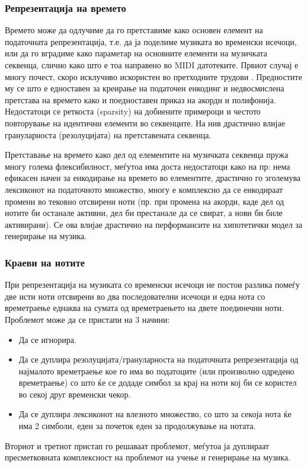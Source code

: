 \subsubsection{Репрезентација на времето}

Времето може да одлучиме да го претставиме како основен елемент на податочната репрезентација, т.е. да ја поделиме музиката во временски исечоци, или да го вградиме како параметар на основните елементи на музичката секвенца, слично како што е тоа направено во MIDI датотеките. Првиот случај е многу почест, скоро исклучиво искористен во претходните трудови \cite{Hadjeres2016,Boulanger-Lewandowski2012,Boulanger-Lewandowski2014,Eck2002,Eck2008,Walder2016,Dong2017,Dong2018}. Предностите му се што е едноставен за креирање на податочен енкодинг и недвосмислена претстава на времето како и поедноставен приказ на акорди и полифонија. Недостатоци се реткоста (sparsity) на добиените примероци и честото повторување на идентични елементи во секвенците. На нив драстично влијае грануларноста (резолуцијата) на претставената секвенца. 

Претставање на времето како дел од елементите на музичката секвенца пружа многу голема флексибилност, меѓутоа има доста недостатоци како на пр: нема ефикасен начен за енкодирање на времето во елементите, драстично го зголемува лексиконот на податочното множество, многу е комплексно да се енкодираат промени во тековно отсвирени ноти (пр. при промена на акорди, каде дел од нотите би останале активни, дел би престанале да се свират, а нови би биле активирани). Се ова влијае драстично на перформансите на хипотетички модел за генерирање на музика.

\subsubsection{Краеви на нотите}

При репрезентација на музиката со временски исечоци не постои разлика помеѓу две исти ноти отсвирени во два последователни исечоци и една нота со времетраење еднаква на сумата од времетраењето на двете поединечни ноти. Проблемот може да се пристапи на 3 начини:
\begin{itemize}
    \item Да се игнорира.
    \item Да се дуплира резолуцијата/грануларноста на податочната репрезентација од најмалото времетраење кое го има во податоците (или произволно одредено времетраење) со што ќе се додаде симбол за крај на ноти кој би се користел во секој друг временски чекор.
    \item Да се дуплира лексиконот на влезното множество, со што за секоја нота ќе има 2 симболи, еден за почеток еден за продолжување на нотата.
\end{itemize}
Вториот и третиот пристап го решаваат проблемот, меѓутоа ја дуплираат пресметковната комплексност на проблемот на учење и генерирање на музика.

